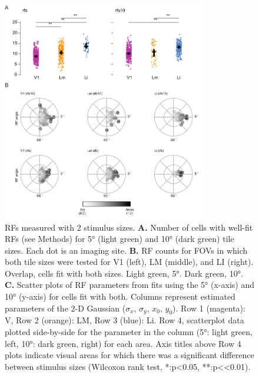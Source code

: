 \begin{figure}[tp!]
\includegraphics[width=0.8\textwidth]{figures/supplemental/fig_s7_rf5_rf10_aggregate/fig_s7_rf5_rf10_aggregate.pdf}
    \caption[RF mapping stimuli]{RFs measured with 2 stimulus sizes.
    \textbf{A.} Number of cells with well-fit RFs (see Methods) for \ang{5} (light green) and \ang{10} (dark green) tile sizes. Each dot is an imaging site.
    \textbf{B.} RF counts for FOVs in which both tile sizes were tested for V1 (left), LM (middle), and LI (right). Overlap, cells fit with both sizes. Light green, \ang{5}. Dark green, \ang{10}.
    \textbf{C.} Scatter plots of RF parameters from fits using the \ang{5} (x-axis) and \ang{10} (y-axis) for cells fit with both. Columns represent estimated parameters of the 2-D Gaussian ($\sigma_x$, $\sigma_y$, $x_0$, $y_0$). Row 1 (magenta): V, Row 2 (orange): LM, Row 3 (blue): Li. Row 4, scatterplot data plotted side-by-side for the parameter in the column (\ang{5}: light green, left, \ang{10}: dark green, right) for each area. Axis titles above Row 4 plots indicate visual areas for which there was a significant difference between stimulus sizes (Wilcoxon rank test, *:p<0.05, **:p<<0.01).
    \label{supfig:rf5_rf10_aggregate}}
\end{figure}


